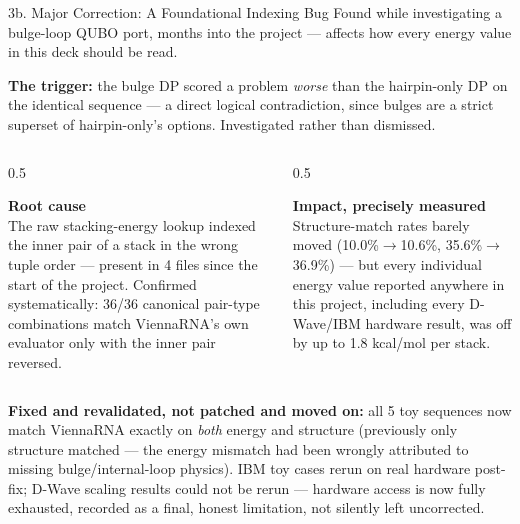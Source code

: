 \documentclass[aspectratio=169,10pt]{beamer}
\begin{document}
\begin{frame}{3b. Major Correction: A Foundational Indexing Bug}
  \small Found while investigating a bulge-loop QUBO port, months into the project --- affects how every energy value in this deck should be read.
  \vspace{6pt}
  \begin{redbox}
  \textbf{The trigger:} the bulge DP scored a problem \emph{worse} than the hairpin-only DP on the identical sequence --- a direct logical contradiction, since bulges are a strict superset of hairpin-only's options. Investigated rather than dismissed.
  \end{redbox}
  \vspace{8pt}
  \begin{columns}[T]
    \begin{column}{0.5\textwidth}
      \begin{cardbox}
      \textbf{\color{navy}Root cause}\\[4pt]
      \footnotesize The raw stacking-energy lookup indexed the inner pair of a stack in the wrong tuple order --- present in 4 files since the start of the project. Confirmed systematically: 36/36 canonical pair-type combinations match ViennaRNA's own evaluator only with the inner pair reversed.
      \end{cardbox}
    \end{column}
    \begin{column}{0.5\textwidth}
      \begin{greenbox}
      \textbf{\color{accent}Impact, precisely measured}\\[4pt]
      \footnotesize Structure-match rates barely moved (10.0\%$\to$10.6\%, 35.6\%$\to$36.9\%) --- but every individual energy value reported anywhere in this project, including every D-Wave/IBM hardware result, was off by up to 1.8 kcal/mol per stack.
      \end{greenbox}
    \end{column}
  \end{columns}
  \vspace{8pt}
  \begin{navybox}
  \footnotesize \textbf{Fixed and revalidated, not patched and moved on:} all 5 toy sequences now match ViennaRNA exactly on \emph{both} energy and structure (previously only structure matched --- the energy mismatch had been wrongly attributed to missing bulge/internal-loop physics). IBM toy cases rerun on real hardware post-fix; D-Wave scaling results could not be rerun --- hardware access is now fully exhausted, recorded as a final, honest limitation, not silently left uncorrected.
  \end{navybox}
\end{frame}
\end{document}
